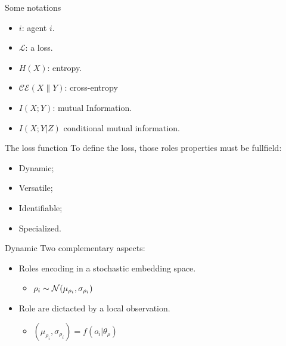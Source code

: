 \documentclass{beamer}
\begin{document}
    \begin{frame}{Some notations}


        \begin{itemize}
            \item $i$: agent $i$.
            \item $\mathcal{L}$: a loss.
            \item $H(X)$: entropy.
            \item $\mathcal{CE}(X\|Y)$: cross-entropy
            \item $I(X;Y)$: mutual Information.
            \item $I(X;Y|Z)$ conditional mutual information.

        \end{itemize}

    \end{frame}

    \begin{frame}{The loss function}
        To define the loss, those roles properties must be fullfield:

        \begin{itemize}
            \item Dynamic;
            \item Versatile;
            \item Identifiable;
            \item Specialized.
        \end{itemize}
    \end{frame}

    \begin{frame}{Dynamic}
        Two complementary aspects:

        \begin{itemize}
            \item Roles encoding in a stochastic embedding space.
            \begin{itemize}
                \item $\rho_i \sim \mathcal{N}(\mu_{\rho_i},\sigma_{\rho_i})$
            \end{itemize}
            \item Role are dictacted by a local observation.
            \begin{itemize}
                \item $(\mu_{\rho_i},\sigma_{\rho_i}) = f(o_i|\theta_{\rho})$
            \end{itemize}
        \end{itemize}

    \end{frame}
\end{document}
